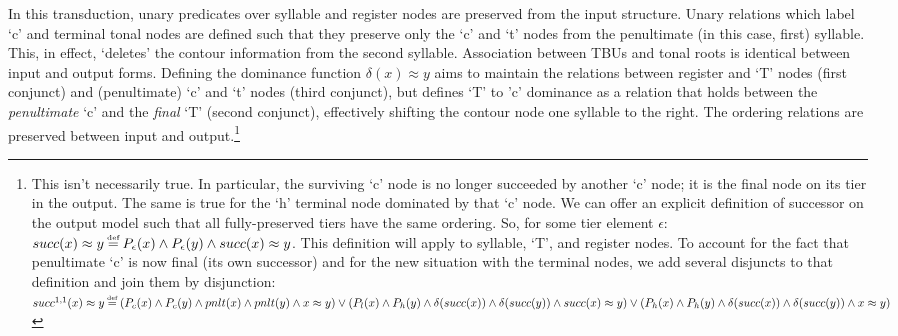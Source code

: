 \documentclass{article}
\newcommand\myeq{\mathrel{\stackrel{\makebox[0pt]{\mbox{\normalfont\tiny def}}}{=}}}
\newcommand{\ap}{\approx}
\begin{document}
In this transduction, unary predicates over syllable and register nodes are preserved from the input structure. Unary relations which label `c' and terminal tonal nodes are defined such that they preserve only the `c' and `t' nodes from the penultimate (in this case, first) syllable. This, in effect, `deletes' the contour information from the second syllable. Association between TBUs and tonal roots is identical between input and output forms. Defining the dominance function $\delta(x)\ap y$ aims to maintain the relations between register and `T' nodes (first conjunct) and (penultimate) `c' and `t' nodes (third conjunct), but defines `T' to 'c' dominance as a relation that holds between the \emph{penultimate} `c' and the \emph{final} `T' (second conjunct), effectively shifting the contour node one syllable to the right. The ordering relations are preserved between input and output.\footnote{This isn't necessarily true. In particular, the surviving `c' node is no longer succeeded by another `c' node; it is the final node on its tier in the output. The same is true for the `h' terminal node dominated by that `c' node. We can offer an explicit definition of successor on the output model such that all fully-preserved tiers have the same ordering. So, for some tier element $\epsilon$: $succ(x)\ap y \myeq P_{\epsilon}(x)\land P_{\epsilon}(y)\land succ(x)\ap y$. This definition will apply to syllable, `T', and register nodes. To account for the fact that penultimate `c' is now final (its own successor) and for the new situation with the terminal nodes, we add several disjuncts to that definition and join them by disjunction: \\
$succ^{1,1}(x)\ap y\myeq (P_{c}(x)\land P_{c}(y)\land pnlt(x)\land pnlt(y)\land x\ap y) \lor \\
(P_{l}(x)\land P_{h}(y)\land \delta(succ(x))\land\delta(succ(y))\land succ(x)\ap y) \lor \\
(P_{h}(x)\land P_{h}(y)\land \delta(succ(x))\land\delta(succ(y))\land x\ap y)$}
\end{document}
